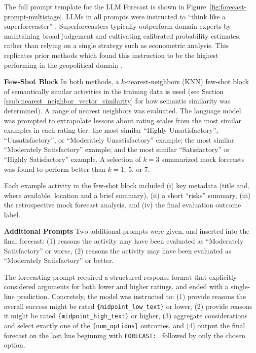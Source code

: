 The full prompt template for the LLM Forecast is shown in Figure~\ref{fig:forecast-prompt-multistage}. LLMs in all prompts were instructed to ``think like a superforecaster'' \citep{tetlockSuperforecastingArtScience2015}. Superforecasters typically outperform domain experts by maintaining broad judgement and cultivating calibrated probability estimates, rather than relying on a single strategy such as econometric analysis. This replicates prior methods which found this instruction to be the highest performing in the geopolitical domain \cite{halawiApproachingHumanLevelForecasting2024}.

\textbf{Few-Shot Block}
In both methods, a $k$-nearest-neighbors (KNN) few-shot block of semantically similar activities in the training data is used (see Section \ref{ssub:nearest_neighbor_vector_similarity} for how semantic similarity was determined). A range of nearest neighbors was evaluated. The language model was prompted to extrapolate lessons about rating scales from the most similar examples in each rating tier: the most similar ``Highly Unsatisfactory'', ``Unsatisfactory'', or ``Moderately Unsatisfactory'' example; the most similar ``Moderately Satisfactory'' example; and the most similar ``Satisfactory'' or ``Highly Satisfactory'' example. A selection of $k=3$ summarized mock forecasts was found to perform better than $k=1$, $5$, or $7$.

Each example activity in the few-shot block included (i) key metadata (title and, where available, location and a brief summary), (ii) a short ``risks'' summary, (iii) the retrospective mock forecast analysis, and (iv) the final evaluation outcome label.

\textbf{Additional Prompts}
Two additional prompts were given, and inserted into the final forecast: (1) reasons the activity may have been evaluated as ``Moderately Satisfactory'' or worse, (2) reasons the activity may have been evaluated as ``Moderately Satisfactory'' or better.

The forecasting prompt required a structured response format that explicitly considered arguments for both lower and higher ratings, and ended with a single-line prediction. Concretely, the model was instructed to: (1) provide reasons the overall success might be rated \texttt{\{midpoint\_low\_text\}} or lower, (2) provide reasons it might be rated \texttt{\{midpoint\_high\_text\}} or higher, (3) aggregate considerations and select exactly one of the \texttt{\{num\_options\}} outcomes, and (4) output the final forecast on the last line beginning with \texttt{FORECAST: } followed by only the chosen option.

